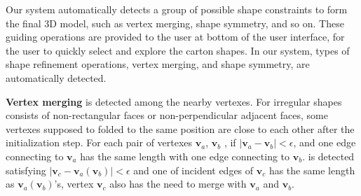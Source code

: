 
Our system  automatically detects a group of possible shape constraints to form the final 3D model, such as vertex merging, shape symmetry, and so on. 
%
These guiding operations are provided to the user at bottom of the user interface, for the user to quickly select and explore the carton shapes.
In our system,  types of shape refinement operations, vertex merging, and shape symmetry, are automatically detected.

%

\noindent
\textbf{Vertex merging} is detected among the nearby vertexes. 
For irregular shapes consists of non-rectangular faces or non-perpendicular adjacent faces, some vertexes supposed to folded to the same position are close to each other after the initialization step. 
For each pair of vertexes $\mathbf{v}_a$, $\mathbf{v}_b$ {\color{blue}{that in the nonadjacent face}}, if $|\mathbf{v}_a-\mathbf{v}_b|<\epsilon$, and one edge connecting to $\mathbf{v}_a$ has the same length with one edge connecting to $\mathbf{v}_b$.
{ is detected satisfying $|\mathbf{v}_c-\mathbf{v}_a(\mathbf{v}_b)|<\epsilon$ and one of incident edges of $\mathbf{v}_c$ has the same length as $\mathbf{v}_a(\mathbf{v}_b)$'s, vertex $\mathbf{v}_c$ also has the need to merge with $\mathbf{v}_a$ and $\mathbf{v}_b$.}


